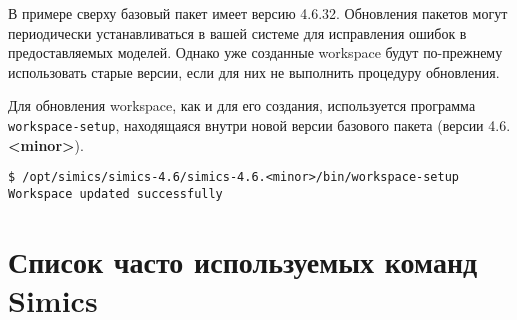 В примере сверху базовый пакет имеет версию 4.6.32. Обновления пакетов могут периодически устанавливаться в вашей системе для исправления ошибок в предоставляемых моделей. Однако уже созданные workspace будут по-прежнему использовать старые версии, если для них не выполнить процедуру обновления. 

Для обновления workspace, как и для его создания, используется программа \texttt{workspace-setup}, находящаяся внутри новой версии базового пакета (версии 4.6.\textbf{<minor>}).

\begin{lstlisting}
$ /opt/simics/simics-4.6/simics-4.6.<minor>/bin/workspace-setup
Workspace updated successfully
\end{lstlisting}

\section{Список часто используемых команд Simics}


